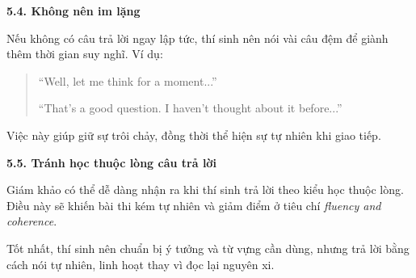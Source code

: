 \bigskip
\textbf{5.4. Không nên im lặng}  

\vspace{.25cm}
Nếu không có câu trả lời ngay lập tức, thí sinh nên nói vài câu đệm để giành thêm thời gian suy nghĩ.  
Ví dụ:  
\begin{quote}
``Well, let me think for a moment...''  

``That’s a good question. I haven’t thought about it before...''  
\end{quote}

Việc này giúp giữ sự trôi chảy, đồng thời thể hiện sự tự nhiên khi giao tiếp.

\newpage
\textbf{5.5. Tránh học thuộc lòng câu trả lời}  

\vspace{.25cm}
Giám khảo có thể dễ dàng nhận ra khi thí sinh trả lời theo kiểu học thuộc lòng.  
Điều này sẽ khiến bài thi kém tự nhiên và giảm điểm ở tiêu chí \textit{fluency and coherence}.  

Tốt nhất, thí sinh nên chuẩn bị ý tưởng và từ vựng cần dùng, nhưng trả lời bằng cách nói tự nhiên, linh hoạt thay vì đọc lại nguyên xi.  


